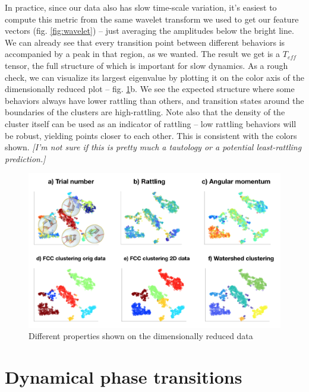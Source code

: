 \documentclass[reprint,prx]{revtex4-1}
\renewcommand{\=}[1]{\stackrel{#1}{=}} %
\renewcommand{\(}{\left (}
\renewcommand{\)}{\right  )}
\renewcommand{\[}{\left [}
\renewcommand{\]}{\right ]}
\newcommand{\<}{\left <}
\renewcommand{\>}{\right >}
\theoremstyle{definition}
\theoremstyle{remark}
\renewcommand{\todo}[1]{\textit{\color{red}[#1]}}
\begin{document}
In practice, since our data also has slow time-scale variation, it's easiest to compute this metric from the same wavelet transform we used to get our feature vectors (fig. \ref{fig:wavelet}) -- just averaging the amplitudes below the bright line. We can already see that every transition point between different behaviors is accompanied by a peak in that region, as we wanted. The result we get is a $ T_{eff} $ tensor, the full structure of which is important for slow dynamics. As a rough check, we can visualize its largest eigenvalue by plotting it on the color axis of the dimensionally reduced plot -- fig. \ref{fig:dimRed_colors}b. We see the expected structure where some behaviors always have lower rattling than others, and transition states around the boundaries of the clusters are high-rattling. Note also that the density of the cluster itself can be used as an indicator of rattling -- low rattling behaviors will be robust, yielding points closer to each other. This is consistent with the colors shown. \todo{I'm not sure if this is pretty much a tautology or a potential least-rattling prediction.}

\begin{figure}
	\includegraphics[width=\textwidth]{colorsExp.png}
	\caption{Different properties shown on the dimensionally reduced data \label{fig:dimRed_colors}}
\end{figure}


\section{Dynamical phase transitions} \label{sec:dynPhaseTrans}
\end{document}
